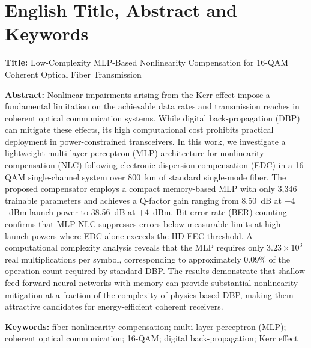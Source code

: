 \documentclass[conference]{IEEEtran}
\begin{document}
\section*{English Title, Abstract and Keywords}

\noindent\textbf{Title:} Low-Complexity MLP-Based Nonlinearity Compensation for 16-QAM Coherent Optical Fiber Transmission

\vspace{2mm}
\noindent\textbf{Abstract:} Nonlinear impairments arising from the Kerr effect impose a fundamental limitation on the achievable data rates and transmission reaches in coherent optical communication systems. While digital back-propagation (DBP) can mitigate these effects, its high computational cost prohibits practical deployment in power-constrained transceivers. In this work, we investigate a lightweight multi-layer perceptron (MLP) architecture for nonlinearity compensation (NLC) following electronic dispersion compensation (EDC) in a 16-QAM single-channel system over 800~km of standard single-mode fiber. The proposed compensator employs a compact memory-based MLP with only 3,346 trainable parameters and achieves a Q-factor gain ranging from 8.50~dB at $-4$~dBm launch power to 38.56~dB at $+4$~dBm. Bit-error rate (BER) counting confirms that MLP-NLC suppresses errors below measurable limits at high launch powers where EDC alone exceeds the HD-FEC threshold. A computational complexity analysis reveals that the MLP requires only $3.23 \times 10^3$ real multiplications per symbol, corresponding to approximately 0.09\% of the operation count required by standard DBP. The results demonstrate that shallow feed-forward neural networks with memory can provide substantial nonlinearity mitigation at a fraction of the complexity of physics-based DBP, making them attractive candidates for energy-efficient coherent receivers.

\vspace{2mm}
\noindent\textbf{Keywords:} fiber nonlinearity compensation; multi-layer perceptron (MLP); coherent optical communication; 16-QAM; digital back-propagation; Kerr effect
\end{document}

